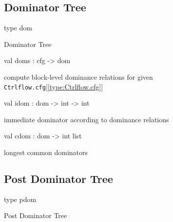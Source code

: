 \documentclass[11pt]{article}
\begin{document}
\subsection{Dominator Tree}




\label{type:Ctrlflow.dom}\begin{ocamldoccode}
type dom 
\end{ocamldoccode}
\begin{ocamldocdescription}
Dominator Tree


\end{ocamldocdescription}




\label{val:Ctrlflow.doms}\begin{ocamldoccode}
val doms : cfg -> dom
\end{ocamldoccode}
\begin{ocamldocdescription}
compute block-level dominance relations for given {\tt{Ctrlflow.cfg}}[\ref{type:Ctrlflow.cfg}]


\end{ocamldocdescription}




\label{val:Ctrlflow.idom}\begin{ocamldoccode}
val idom : dom -> int -> int
\end{ocamldoccode}
\begin{ocamldocdescription}
immediate dominator according to dominance relations


\end{ocamldocdescription}




\label{val:Ctrlflow.cdom}\begin{ocamldoccode}
val cdom : dom -> int list
\end{ocamldoccode}
\begin{ocamldocdescription}
longest common dominators


\end{ocamldocdescription}




\subsection{Post Dominator Tree}




\label{type:Ctrlflow.pdom}\begin{ocamldoccode}
type pdom 
\end{ocamldoccode}
\begin{ocamldocdescription}
Post Dominator Tree


\end{ocamldocdescription}
\end{document}
